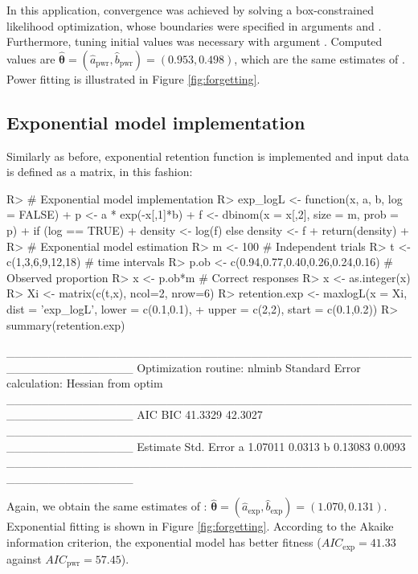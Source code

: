\documentclass[nojss]{jss}
\begin{document}
In this application, convergence was achieved by solving a box-constrained likelihood optimization, whose boundaries were specified in arguments  and . Furthermore, tuning initial values was necessary with argument . Computed values are $\hat{\boldsymbol{\theta}}=(\hat{a}_{\text{pwr}},\hat{b}_{\text{pwr}})=(0.953,0.498)$, which are the same estimates of \cite{Myung2003}. Power fitting is illustrated in Figure \ref{fig:forgetting}.

\subsection*{Exponential model implementation}

Similarly as before, exponential retention function is implemented and input data is defined as a matrix, in this fashion:

\begin{Schunk}
\begin{Sinput}
R> # Exponential model implementation
R> exp_logL <- function(x, a, b, log = FALSE){
+    p <- a * exp(-x[,1]*b)
+    f <- dbinom(x = x[,2], size = m, prob = p)
+    if (log == TRUE)
+      density <- log(f) else density <- f
+    return(density)
+  }
R> # Exponential model estimation
R> m <- 100 # Independent trials
R> t <- c(1,3,6,9,12,18) # time intervals
R> p.ob <- c(0.94,0.77,0.40,0.26,0.24,0.16) # Observed proportion
R> x <- p.ob*m # Correct responses
R> x <- as.integer(x)
R> Xi <- matrix(c(t,x), ncol=2, nrow=6)
R> retention.exp <- maxlogL(x = Xi, dist = 'exp_logL', lower = c(0.1,0.1),
+                           upper = c(2,2), start = c(0.1,0.2))
R> summary(retention.exp)
\end{Sinput}
\begin{Soutput}
_______________________________________________________________
Optimization routine: nlminb 
Standard Error calculation: Hessian from optim 
_______________________________________________________________
      AIC     BIC
  41.3329 42.3027
_______________________________________________________________
  Estimate  Std. Error
a   1.07011     0.0313
b   0.13083     0.0093
_______________________________________________________________
\end{Soutput}
\end{Schunk}

Again, we obtain the same estimates of \cite{Myung2003}: $\hat{\boldsymbol{\theta}}=(\hat{a}_{\text{exp}},\hat{b}_{\text{exp}})=(1.070,0.131)$. Exponential fitting is shown in Figure \ref{fig:forgetting}. According to the Akaike information criterion, the exponential model has better fitness ($AIC_{\text{exp}}=41.33$ against $AIC_{\text{pwr}}=57.45$).
\end{document}
